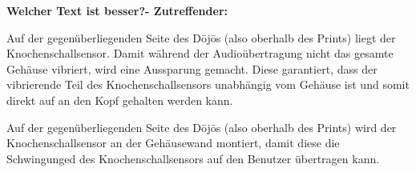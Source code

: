 \textbf{Welcher Text ist besser?- Zutreffender:}
 
Auf der gegenüberliegenden Seite des Dōjōs (also oberhalb des Prints) liegt der Knochenschallsensor. Damit während der Audioübertragung nicht das gesamte Gehäuse vibriert, wird eine Aussparung gemacht. Diese garantiert, dass der vibrierende Teil des Knochenschallsensors unabhängig vom Gehäuse ist und somit direkt auf an den Kopf gehalten werden kann.
 
Auf der gegenüberliegenden Seite des Dōjōs (also oberhalb des Prints) wird der Knochenschallsensor an der Gehäusewand montiert, damit diese die Schwingunged des Knochenschallsensors auf den Benutzer übertragen kann.
